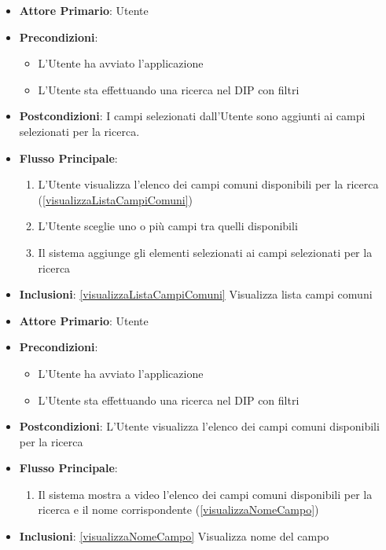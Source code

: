\begin{itemize}
      \item \textbf{Attore Primario}: Utente
      \item \textbf{Precondizioni}: \begin{itemize}
            \item L'Utente ha avviato l'applicazione
            \item L'Utente sta effettuando una ricerca nel DIP con filtri
      \end{itemize}
      \item \textbf{Postcondizioni}:  I campi selezionati dall'Utente sono aggiunti ai campi selezionati per la ricerca.
      \item \textbf{Flusso Principale}:
      \begin{enumerate}
            \item L'Utente visualizza l'elenco dei campi comuni disponibili per la ricerca (\ref{visualizzaListaCampiComuni})
            \item L'Utente sceglie uno o più campi tra quelli disponibili
            \item Il sistema aggiunge gli elementi selezionati ai campi selezionati per la ricerca
      \end{enumerate}
      \item \textbf{Inclusioni}: \ref{visualizzaListaCampiComuni} Visualizza lista campi comuni
\end{itemize}

\begin{itemize}
      \item \textbf{Attore Primario}: Utente
      \item \textbf{Precondizioni}: 
      \begin{itemize}
            \item L'Utente ha avviato l'applicazione
            \item L'Utente sta effettuando una ricerca nel DIP con filtri
      \end{itemize}
      \item \textbf{Postcondizioni}:  L'Utente visualizza l'elenco dei campi comuni disponibili per la ricerca
      \item \textbf{Flusso Principale}:
      \begin{enumerate}
            \item Il sistema mostra a video l'elenco dei campi comuni disponibili per la ricerca e il nome corrispondente (\ref{visualizzaNomeCampo})
      \end{enumerate}
      \item \textbf{Inclusioni}: \ref{visualizzaNomeCampo} Visualizza nome del campo
\end{itemize}

